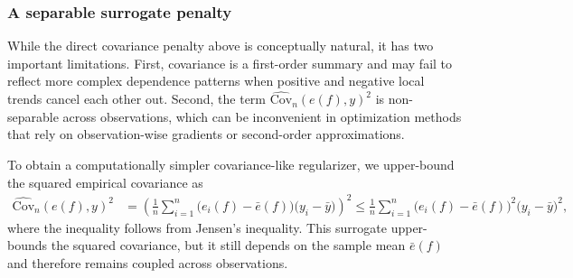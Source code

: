 \documentclass[12pt, draft]{article}
\theoremstyle{plain}
\theoremstyle{definition}
\newcommand{\1}{\mathbf{1}}
\newcommand{\Cov}{\text{Cov}}
\renewcommand{\H}{\mathcal{H}}
\begin{document}
{%




\subsubsection{A separable surrogate penalty}

While the direct covariance penalty above is conceptually natural, it has two important limitations. First, covariance is a first-order summary and may fail to reflect more complex dependence patterns when positive and negative local trends cancel each other out. Second, the term $\widehat{\Cov}_n(e(f),y)^2$ is non-separable across observations, which can be inconvenient in optimization methods that rely on observation-wise gradients or second-order approximations.

To obtain a computationally simpler covariance-like regularizer, we upper-bound the squared empirical covariance as
\begin{align}
    \label{eq:covariance_upper_bound}
    \widehat{\Cov}_n(e(f),y)^2
    &=
    \left(
        \frac{1}{n}\sum_{i=1}^n
        \bigl(e_i(f)-\bar e(f)\bigr)\bigl(y_i-\bar y\bigr)
    \right)^2 
    \le
    \frac{1}{n}\sum_{i=1}^n
    \bigl(e_i(f)-\bar e(f)\bigr)^2
    \bigl(y_i-\bar y\bigr)^2,
\end{align}
where the inequality follows from Jensen's inequality. This surrogate upper-bounds the squared covariance, but it still depends on the sample mean $\bar e(f)$ and therefore remains coupled across observations.


}
\end{document}
